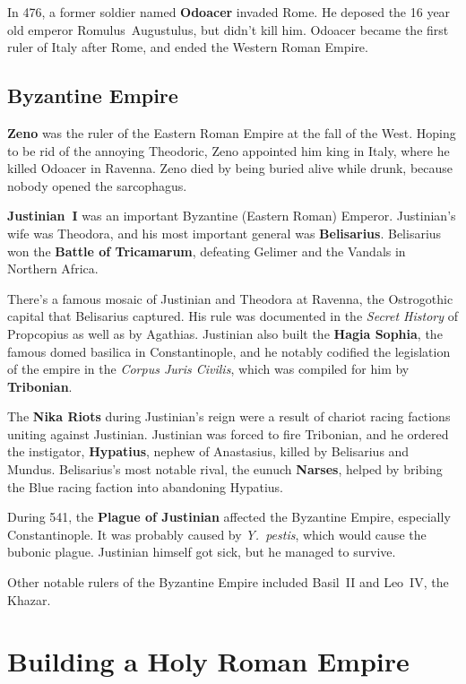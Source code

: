 In 476, a former soldier named \textbf{Odoacer} invaded Rome.
He deposed the 16 year old emperor Romulus~Augustulus, but didn't kill him.
Odoacer became the first ruler of Italy after Rome, and ended the Western Roman Empire.

\subsection*{Byzantine Empire}

\textbf{Zeno} was the ruler of the Eastern Roman Empire at the fall of the West.
Hoping to be rid of the annoying Theodoric, Zeno appointed him king in Italy,
where he killed Odoacer in Ravenna.
Zeno died by being buried alive while drunk, because nobody opened the sarcophagus.

\textbf{Justinian~I} was an important Byzantine (Eastern Roman) Emperor.
Justinian's wife was Theodora, and his most important general was \textbf{Belisarius}.
Belisarius won the \textbf{Battle of Tricamarum},
defeating Gelimer and the Vandals in Northern Africa.

There's a famous mosaic of Justinian and Theodora at Ravenna,
the Ostrogothic capital that Belisarius captured.
His rule was documented in the \textit{Secret History} of Propcopius as well as by Agathias.
Justinian also built the \textbf{Hagia Sophia}, the famous domed basilica in Constantinople,
and he notably codified the legislation of the empire in the \textit{Corpus Juris Civilis},
which was compiled for him by \textbf{Tribonian}.

The \textbf{Nika Riots} during Justinian's reign were a result of chariot racing factions uniting against Justinian.
Justinian was forced to fire Tribonian,
and he ordered the instigator, \textbf{Hypatius}, nephew of Anastasius,
killed by Belisarius and Mundus.
Belisarius's most notable rival, the eunuch \textbf{Narses},
helped by bribing the Blue racing faction into abandoning Hypatius.

During 541, the \textbf{Plague of Justinian} affected the Byzantine Empire, especially Constantinople.
It was probably caused by \textit{Y.\ pestis}, which would cause the bubonic plague.
Justinian himself got sick, but he managed to survive.

Other notable rulers of the Byzantine Empire included Basil~II and Leo~IV, the Khazar.

\section{Building a Holy Roman Empire}

